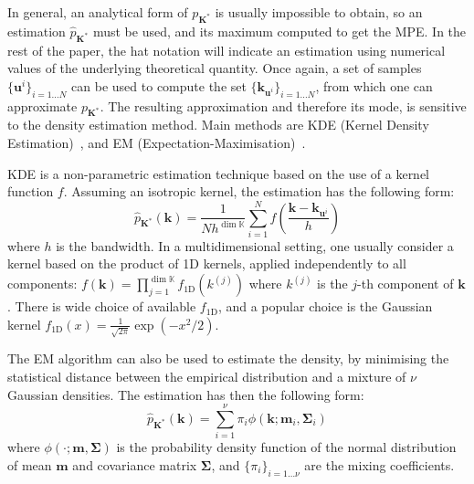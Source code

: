 \documentclass[preprint, 1p]{elsarticle}
\newcommand{\Kspace}{\mathbb{K}}
\begin{document}
In general, an analytical form of $p_{\mathbf{K}^*}$ is usually impossible to obtain, so an estimation $\hat{p}_{\mathbf{K}^*}$ must be used, and its maximum computed to get the MPE.
In the rest of the paper, the hat notation will indicate an estimation using numerical values of the underlying theoretical quantity.
Once again, a set of samples  $\{\mathbf{u}^i\}_{i=1\dots N}$ can be used to compute the set $\{\mathbf{k}_{\mathbf{u}^i}\}_{i=1\dots N}$, from which one can 
approximate  $p_{\mathbf{K}^*}$. The resulting approximation and therefore its mode, is sensitive to the density estimation method. Main methods are KDE (Kernel Density Estimation)~\citep{silverman_density_2018}, and EM (Expectation-Maximisation)~\citep{dempster_maximum_1977}.


KDE is a non-parametric estimation technique based on the use of a kernel function $f$. Assuming an isotropic kernel, the estimation has the following form:
\begin{equation}
\hat{p}_{\mathbf{K}^*}(\mathbf{k}) = \frac{1}{Nh^{\dim \Kspace}} \sum_{i=1}^N f\left(\frac{\mathbf{k} - \mathbf{k}_{\mathbf{u}^i}}{h}\right)
\end{equation}
where $h$ is the bandwidth. In a multidimensional setting, one usually consider a kernel based on the product of 1D kernels, applied independently to all components: $f(\mathbf{k}) = \prod_{j=1}^{\dim \Kspace} f_{\mathrm{1D}} (k^{(j)})$
where $k^{(j)}$ is the $j$-th component of $\mathbf{k}$.  There is wide choice of available $f_{\mathrm{1D}}$, and a popular choice is  %
the Gaussian kernel $f_{\mathrm{1D}}(x)= \frac{1}{\sqrt{2\pi}}\exp(-x^2 / 2)$. %

The EM algorithm can also be used to estimate the density, by minimising the statistical distance between the empirical distribution and a mixture of $\nu$ Gaussian densities. The estimation has then the following form:
\begin{equation}
\hat{p}_{\mathbf{K}^*}(\mathbf{k}) = \sum_{i=1}^{\nu} \pi_i \phi(\mathbf{k}; \mathbf{m}_i, \mathbf{\Sigma}_i)
\end{equation}
where $\phi( \cdot; \mathbf{m}, \mathbf{\Sigma})$ is the probability density function of the normal distribution of mean $\mathbf{m}$ and covariance matrix $\mathbf{\Sigma}$, and $\{\pi_i \}_{i=1 \dots \nu}$ are the mixing coefficients.
\end{document}
